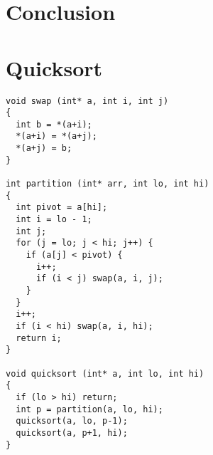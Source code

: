 \documentclass[11pt,openany]{article}
\begin{document}
		
\section{Conclusion}





\appendix
\section*{Quicksort}
\begin{lstlisting}
void swap (int* a, int i, int j)
{
  int b = *(a+i);
  *(a+i) = *(a+j);
  *(a+j) = b;
}

int partition (int* arr, int lo, int hi)
{
  int pivot = a[hi];
  int i = lo - 1;
  int j;
  for (j = lo; j < hi; j++) {
    if (a[j] < pivot) {
      i++;
      if (i < j) swap(a, i, j);
    }
  }
  i++;
  if (i < hi) swap(a, i, hi);
  return i;
}

void quicksort (int* a, int lo, int hi)
{
  if (lo > hi) return;
  int p = partition(a, lo, hi);
  quicksort(a, lo, p-1);
  quicksort(a, p+1, hi);
}

		\end{lstlisting}
\end{document}
